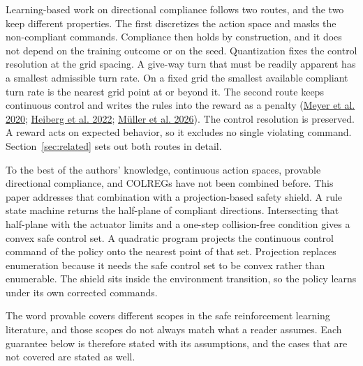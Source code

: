\documentclass[10pt,letterpaper]{article}
\newcommand{\citm}[1]{(#1)}
\newcommand{\cl}[2]{\hyperlink{ref:#1}{#2}}
\begin{document}
Learning-based work on directional compliance follows two routes, and the two keep
different properties. The first discretizes the action space and masks the non-compliant
commands. Compliance then holds by construction, and it does not depend on the training
outcome or on the seed. Quantization fixes the control resolution at the grid spacing. A give-way turn that must be readily apparent has a smallest admissible turn rate. On a
fixed grid the smallest available compliant turn rate is the nearest grid point at or
beyond it. The second route keeps continuous control and writes the rules into the
reward as a penalty \citm{\cl{meyer2020}{Meyer et al. 2020}; \cl{heiberg2022}{Heiberg et
al. 2022}; \cl{mller2026}{M\"uller et al. 2026}}. The control resolution is preserved. A
reward acts on expected behavior, so it excludes no single violating command.
Section~\ref{sec:related} sets out both routes in detail.

To the best of the authors' knowledge, continuous action spaces, provable directional compliance, and COLREGs have not been
combined before. This paper addresses that
combination with a projection-based safety shield. A rule state machine returns the
half-plane of compliant directions. Intersecting that half-plane with the actuator limits and a one-step collision-free
condition gives a convex safe control set. A
quadratic program projects the continuous control command of the policy onto the nearest
point of that set. Projection replaces enumeration because it needs the safe control set
to be convex rather than enumerable. The shield sits inside the environment transition,
so the policy learns under its own corrected commands.

The word provable covers
different scopes in the safe reinforcement learning literature, and those scopes do not
always match what a reader assumes. Each guarantee below is therefore stated with its
assumptions, and the cases that are not covered are stated as well.
\end{document}
